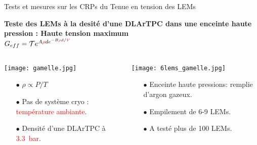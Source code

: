     \begin{frame}{Tests et mesures sur les CRPs du \SSS{}}{Tenue en tension des LEMs}
    	\begin{scriptsize}
    		\begin{center}
    			\textbf{Teste des LEMs à la desité d'une DLArTPC dans une enceinte haute pression : Haute tension maximum}\\
    			$G _{eff}= \mathcal{T}e^{A\textcolor{red}{\rho} d e^{-B\textcolor{red}{\rho}d/\textcolor{red}{V}}}$
    		\end{center} 
    		\begin{columns}
		    	\begin{column}{0.5\textwidth}
		    		\texttt{[image: gamelle.jpg]}\\
		    		\begin{itemize}
		    			\item[$\bullet$] $\rho \propto P/T$
		    			\item[$\bullet$] Pas de système cryo : \textcolor{red}{température ambiante}.
		    			\item[$\bullet$] Densité d'une DLArTPC à \textcolor{red}{\SI{3.3}{\bar}}.
		    		\end{itemize}
		    	\end{column}\hfill
		    	\begin{column}{0.5\textwidth}
		    		\texttt{[image: 6lems\_gamelle.jpg]}\\
		    		\begin{itemize}
		    			\item[$\bullet$] Enceinte haute pressions: remplie d'argon gazeux.
		    			\item[$\bullet$] Empilement de 6-9 LEMs.
		    			\item[$\bullet$] A testé plus de 100 LEMs.
		    		\end{itemize}
		    	\end{column}
		    \end{columns}
	    \end{scriptsize} 
    \end{frame}

